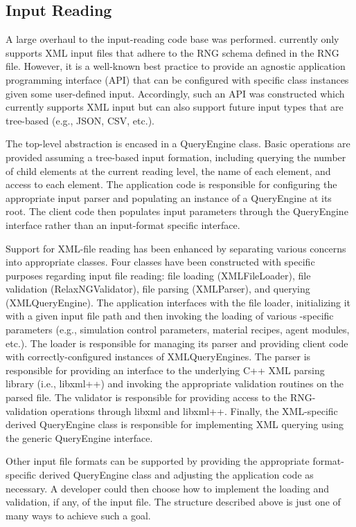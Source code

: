 \subsection{Input Reading}

A large overhaul to the input-reading code base was performed. \Cyclus currently
only supports XML input files that adhere to the RNG schema defined in the
\Cyclus RNG file. However, it is a well-known best practice to provide an
agnostic application programming interface (API) that can be configured with
specific class instances given some user-defined input. Accordingly, such an API
was constructed which currently supports XML input but can also support future
input types that are tree-based (e.g., JSON, CSV, etc.).

The top-level abstraction is encased in a QueryEngine class. Basic operations
are provided assuming a tree-based input formation, including querying the
number of child elements at the current reading level, the name of each element,
and access to each element. The application code is responsible for configuring
the appropriate input parser and populating an instance of a QueryEngine at its
root. The client code then populates input parameters through the QueryEngine
interface rather than an input-format specific interface.

Support for XML-file reading has been enhanced by separating various concerns
into appropriate classes. Four classes have been constructed with specific
purposes regarding input file reading: file loading (XMLFileLoader), file
validation (RelaxNGValidator), file parsing (XMLParser), and querying
(XMLQueryEngine). The application interfaces with the file loader, initializing
it with a given input file path and then invoking the loading of various
\Cyclus-specific parameters (e.g., simulation control parameters, material
recipes, agent modules, etc.). The loader is responsible for managing its parser
and providing client code with correctly-configured instances of
XMLQueryEngines. The parser is responsible for providing an interface to the
underlying C++ XML parsing library (i.e., libxml++) and invoking the appropriate
validation routines on the parsed file. The validator is responsible for
providing access to the RNG-validation operations through libxml and
libxml++. Finally, the XML-specific derived QueryEngine class is responsible for
implementing XML querying using the generic QueryEngine interface.

Other input file formats can be supported by providing the appropriate
format-specific derived QueryEngine class and adjusting the application code as
necessary. A developer could then choose how to implement the loading and
validation, if any, of the input file. The structure described above is just one
of many ways to achieve such a goal.
